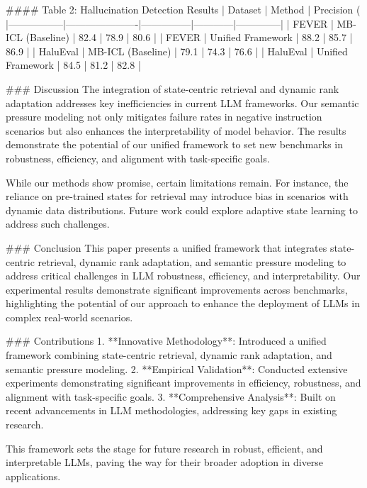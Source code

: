 #### Table 2: Hallucination Detection Results
| Dataset         | Method               | Precision (%
|-----------------|----------------------|---------------|------------|--------------|
| FEVER           | MB-ICL (Baseline)   | 82.4          | 78.9       | 80.6         |
| FEVER           | Unified Framework    | 88.2          | 85.7       | 86.9         |
| HaluEval        | MB-ICL (Baseline)   | 79.1          | 74.3       | 76.6         |
| HaluEval        | Unified Framework    | 84.5          | 81.2       | 82.8         |

### Discussion
The integration of state-centric retrieval and dynamic rank adaptation addresses key inefficiencies in current LLM frameworks. Our semantic pressure modeling not only mitigates failure rates in negative instruction scenarios but also enhances the interpretability of model behavior. The results demonstrate the potential of our unified framework to set new benchmarks in robustness, efficiency, and alignment with task-specific goals.

While our methods show promise, certain limitations remain. For instance, the reliance on pre-trained states for retrieval may introduce bias in scenarios with dynamic data distributions. Future work could explore adaptive state learning to address such challenges.

### Conclusion
This paper presents a unified framework that integrates state-centric retrieval, dynamic rank adaptation, and semantic pressure modeling to address critical challenges in LLM robustness, efficiency, and interpretability. Our experimental results demonstrate significant improvements across benchmarks, highlighting the potential of our approach to enhance the deployment of LLMs in complex real-world scenarios.

### Contributions
1. **Innovative Methodology**: Introduced a unified framework combining state-centric retrieval, dynamic rank adaptation, and semantic pressure modeling.
2. **Empirical Validation**: Conducted extensive experiments demonstrating significant improvements in efficiency, robustness, and alignment with task-specific goals.
3. **Comprehensive Analysis**: Built on recent advancements in LLM methodologies, addressing key gaps in existing research.

This framework sets the stage for future research in robust, efficient, and interpretable LLMs, paving the way for their broader adoption in diverse applications.